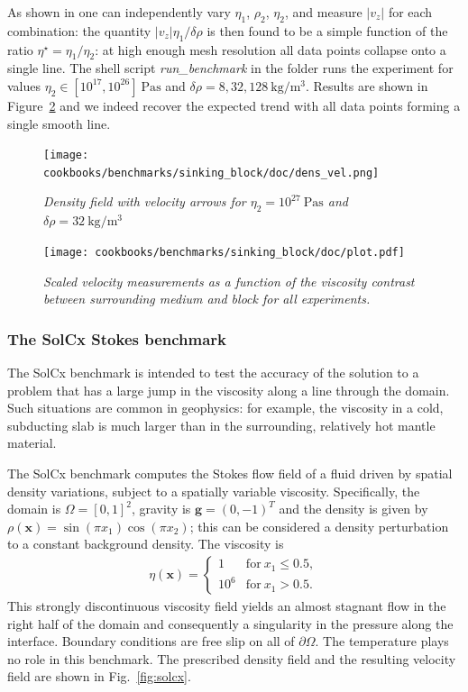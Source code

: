 \documentclass{article}
\begin{document}
As shown in \cite{thie11} one can independently vary $\eta_1$, $\rho_2$, $\eta_2$, and measure $|v_z|$ for each combination: the quantity
$|v_z| \eta_1/\delta\rho$ is then found to be a simple function of the ratio $\eta^\star=\eta_1/\eta_2$:
at high enough mesh resolution all data points collapse onto a single line.
The shell script {\sl run\_benchmark} in the folder runs the experiment for values
$\eta_2\in [10^{17},10^{26}]~\si{\pascal\second}$ and $\delta\rho=8,32,128~\si{\kg\per\cubic\meter}$.
Results are shown in Figure~\ref{fig:sinking_block2} and we indeed recover the expected trend with
all data points forming a single smooth line.

\begin{figure}
  \centering
  \texttt{[image: cookbooks/benchmarks/sinking\_block/doc/dens\_vel.png]}
  \caption{\it Density field with velocity arrows for $\eta_2=10^{27}~\si{\pascal\second}$ and $\delta\rho=32~\si{\kg\per\cubic\meter}$}
  \label{fig:sinking_block1}
\end{figure}

\begin{figure}
  \centering
  \texttt{[image: cookbooks/benchmarks/sinking\_block/doc/plot.pdf]}
  \caption{\it Scaled velocity measurements as a function of the viscosity contrast between surrounding medium and block for all experiments.}
  \label{fig:sinking_block2}
\end{figure}


\subsubsection{The SolCx Stokes benchmark}
\label{sec:benchmark-solcx}

The SolCx benchmark is intended to test the accuracy of the solution to a
problem that has a large jump in the viscosity along a line through the
domain. Such situations are common in geophysics: for example, the viscosity
in a cold, subducting slab is much larger than in the surrounding, relatively
hot mantle material.

The SolCx benchmark computes the Stokes flow field of a fluid driven by
spatial density variations, subject to a spatially variable
viscosity. Specifically, the domain is $\Omega=[0,1]^2$, gravity is $\mathbf
g=(0,-1)^T$ and the density is given
by $\rho(\mathbf x)=\sin(\pi x_1)\cos(\pi x_2)$; this can be considered a
density perturbation to a constant background density. The viscosity is
\begin{align*}
  \eta(\mathbf x) = \left\{
    \begin{matrix}
      1 & \text{for}\ x_1 \le 0.5, \\
      10^6 & \text{for}\ x_1  > 0.5.
    \end{matrix}
  \right.
\end{align*}
This strongly discontinuous viscosity field yields an almost stagnant flow in
the right half of the domain and consequently a singularity in the pressure
along the interface.
Boundary conditions are free slip on all of $\partial\Omega$. The temperature
plays no role in this benchmark. The prescribed density field and the
resulting velocity field are shown in Fig.~\ref{fig:solcx}.
\end{document}
